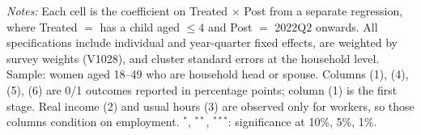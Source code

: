 \begin{table}[htbp]
\begin{tablenotes}
\small
\item \textit{Notes:} Each cell is the coefficient on Treated $\times$ Post from a separate regression, where Treated $=$ has a child aged $\leq 4$ and Post $=$ 2022Q2 onwards. All specifications include individual and year-quarter fixed effects, are weighted by survey weights (V1028), and cluster standard errors at the household level. Sample: women aged 18--49 who are household head or spouse. Columns (1), (4), (5), (6) are 0/1 outcomes reported in percentage points; column (1) is the first stage. Real income (2) and usual hours (3) are observed only for workers, so those columns condition on employment. $^{*}$, $^{**}$, $^{***}$: significance at 10\%, 5\%, 1\%.
\end{tablenotes}
\end{table}

